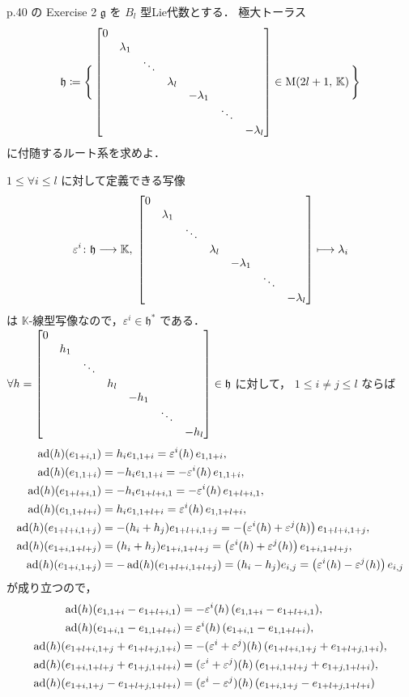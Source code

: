 \documentclass{ltjsarticle}
\theoremstyle{mystyle} %
\numberwithin{equation}{section}
\newcommand{\lto}{\longrightarrow}
\newcommand{\lmto}{\longmapsto}
\begin{document}
\begin{myproblem}[label=ex:2-8-2B]{p.40 の Exercise 2}
    $\mathfrak{g}$ を $B_l$ 型Lie代数とする．
    極大トーラス
    \begin{align}
        \mathfrak{h} \coloneqq \Biggl\{\, \mqty[\dmat{0,\lambda_1,\ddots,\lambda_{l},-\lambda_{1},\ddots,-\lambda_{l}}] \in \Mat{2l+1}{\mathbb{K}} \,\Biggr\} 
    \end{align}
    に付随するルート系を求めよ．
\end{myproblem}

$1 \le \forall i \le l$ に対して定義できる写像
\begin{align}
    \varepsilon^i \colon \mathfrak{h} \lto \mathbb{K},\; \mqty[\dmat{0,\lambda_1,\ddots,\lambda_{l},-\lambda_{1},\ddots,-\lambda_{l}}] \lmto \lambda_i
\end{align}
は $\mathbb{K}$-線型写像なので，$\varepsilon^i \in \mathfrak{h}^*$ である．
$\forall h = \mqty[\dmat{0,h_1,\ddots,h_{l},-h_{1},\ddots,-h_{l}}] \in \mathfrak{h}$ に対して，
$1 \le i \neq j \le l$ ならば
\begin{align}
    \operatorname{ad}(h)(e_{1+i,1}) &= h_i e_{1,1+i} = \varepsilon^i(h)\, e_{1,1+i}, \\
    \operatorname{ad}(h)(e_{1,1+i}) &= -h_i e_{1,1+i} = -\varepsilon^i(h)\, e_{1,1+i}, \\
    \operatorname{ad}(h)(e_{1+l+i,1}) &= -h_i e_{1+l+i,1} = -\varepsilon^i(h)\, e_{1+l+i,1}, \\
    \operatorname{ad}(h)(e_{1,1+l+i}) &= h_i e_{1,1+l+i} = \varepsilon^i(h)\, e_{1,1+l+i}, \\
    \operatorname{ad}(h)(e_{1+l+i,1+j}) &= -(h_i + h_j) e_{1+l+i,1+j} = -\bigl( \varepsilon^i(h) + \varepsilon^j(h) \bigr)\, e_{1+l+i,1+j} , \\
    \operatorname{ad}(h)(e_{1+i,1+l+j}) &= (h_i + h_j) e_{1+i,1+l+j} = \bigl( \varepsilon^i(h) + \varepsilon^j(h) \bigr)\,  e_{1+i,1+l+j}, \\
    \operatorname{ad}(h)(e_{1+i,1+j}) &= - \operatorname{ad}(h)(e_{1+l+i,1+l+j}) = (h_i - h_j) e_{i,j} = \bigl( \varepsilon^i(h) - \varepsilon^j(h) \bigr)\, e_{i,j}
\end{align}
が成り立つので，
\begin{align}
    \operatorname{ad}(h)(e_{1,1+i} - e_{1+l+i,1}) &= -\varepsilon^i(h)\, (e_{1,1+i} - e_{1+l+i,1}), \\
    \operatorname{ad}(h)(e_{1+i,1} - e_{1,1+l+i}) &= \varepsilon^i(h)\,(e_{1+i,1} - e_{1,1+l+i}), \\
    \operatorname{ad}(h)(e_{1+l+i,1+j} + e_{1+l+j,1+i}) &= -(\varepsilon^i + \varepsilon^j)(h)\, (e_{1+l+i,1+j} + e_{1+l+j,1+i}), \\
    \operatorname{ad}(h)(e_{1+i,1+l+j} + e_{1+j,1+l+i}) &= (\varepsilon^i + \varepsilon^j)(h)\, (e_{1+i,1+l+j} + e_{1+j,1+l+i}), \\
    \operatorname{ad}(h)(e_{1+i,1+j} - e_{1+l+j,1+l+i}) &= (\varepsilon^i - \varepsilon^j)(h)\, (e_{1+i,1+j} - e_{1+l+j,1+l+i})
\end{align}
\end{document}
